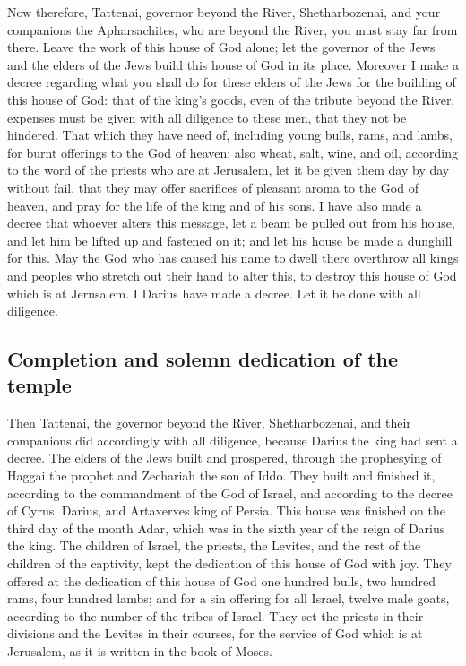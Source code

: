  Now therefore, Tattenai, governor beyond the River,
Shetharbozenai, and your companions the Apharsachites, who are beyond
the River, you must stay far from there.  Leave the work
of this house of God alone; let the governor of the Jews and the elders
of the Jews build this house of God in its place. 
Moreover I make a decree regarding what you shall do for these elders of
the Jews for the building of this house of God: that of the king's
goods, even of the tribute beyond the River, expenses must be given with
all diligence to these men, that they not be hindered. 
That which they have need of, including young bulls, rams, and lambs,
for burnt offerings to the God of heaven; also wheat, salt, wine, and
oil, according to the word of the priests who are at Jerusalem, let it
be given them day by day without fail,  that they may
offer sacrifices of pleasant aroma to the God of heaven, and pray for
the life of the king and of his sons.  I have also made a
decree that whoever alters this message, let a beam be pulled out from
his house, and let him be lifted up and fastened on it; and let his
house be made a dunghill for this.  May the God who has
caused his name to dwell there overthrow all kings and peoples who
stretch out their hand to alter this, to destroy this house of God which
is at Jerusalem. I Darius have made a decree. Let it be done with all
diligence.

\hypertarget{completion-and-solemn-dedication-of-the-temple}{%
\subsection{Completion and solemn dedication of the
temple}\label{completion-and-solemn-dedication-of-the-temple}}

 Then Tattenai, the governor beyond the River,
Shetharbozenai, and their companions did accordingly with all diligence,
because Darius the king had sent a decree.  The elders of
the Jews built and prospered, through the prophesying of Haggai the
prophet and Zechariah the son of Iddo. They built and finished it,
according to the commandment of the God of Israel, and according to the
decree of Cyrus, Darius, and Artaxerxes king of Persia. 
This house was finished on the third day of the month Adar, which was in
the sixth year of the reign of Darius the king.  The
children of Israel, the priests, the Levites, and the rest of the
children of the captivity, kept the dedication of this house of God with
joy.  They offered at the dedication of this house of God
one hundred bulls, two hundred rams, four hundred lambs; and for a sin
offering for all Israel, twelve male goats, according to the number of
the tribes of Israel.  They set the priests in their
divisions and the Levites in their courses, for the service of God which
is at Jerusalem, as it is written in the book of Moses.

